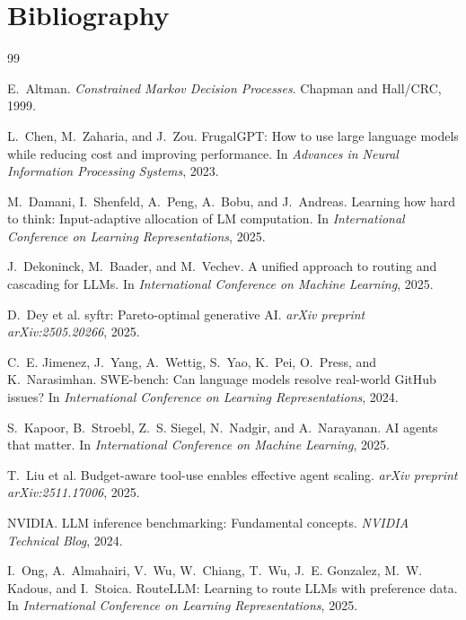 \documentclass[11pt]{book}
\begin{document}
\section*{Bibliography}

\begin{thebibliography}{99}

E.~Altman.
\newblock \emph{Constrained Markov Decision Processes}.
\newblock Chapman and Hall/CRC, 1999.

L.~Chen, M.~Zaharia, and J.~Zou.
\newblock FrugalGPT: How to use large language models while reducing cost and improving performance.
\newblock In \emph{Advances in Neural Information Processing Systems}, 2023.

M.~Damani, I.~Shenfeld, A.~Peng, A.~Bobu, and J.~Andreas.
\newblock Learning how hard to think: Input-adaptive allocation of LM computation.
\newblock In \emph{International Conference on Learning Representations}, 2025.

J.~Dekoninck, M.~Baader, and M.~Vechev.
\newblock A unified approach to routing and cascading for LLMs.
\newblock In \emph{International Conference on Machine Learning}, 2025.

D.~Dey et al.
\newblock syftr: Pareto-optimal generative AI.
\newblock \emph{arXiv preprint arXiv:2505.20266}, 2025.

C.~E. Jimenez, J.~Yang, A.~Wettig, S.~Yao, K.~Pei, O.~Press, and K.~Narasimhan.
\newblock SWE-bench: Can language models resolve real-world GitHub issues?
\newblock In \emph{International Conference on Learning Representations}, 2024.

S.~Kapoor, B.~Stroebl, Z.~S. Siegel, N.~Nadgir, and A.~Narayanan.
\newblock AI agents that matter.
\newblock In \emph{International Conference on Machine Learning}, 2025.

T.~Liu et al.
\newblock Budget-aware tool-use enables effective agent scaling.
\newblock \emph{arXiv preprint arXiv:2511.17006}, 2025.

NVIDIA.
\newblock LLM inference benchmarking: Fundamental concepts.
\newblock \emph{NVIDIA Technical Blog}, 2024.

I.~Ong, A.~Almahairi, V.~Wu, W.~Chiang, T.~Wu, J.~E. Gonzalez, M.~W. Kadous, and I.~Stoica.
\newblock RouteLLM: Learning to route LLMs with preference data.
\newblock In \emph{International Conference on Learning Representations}, 2025.


\end{thebibliography}
\end{document}
